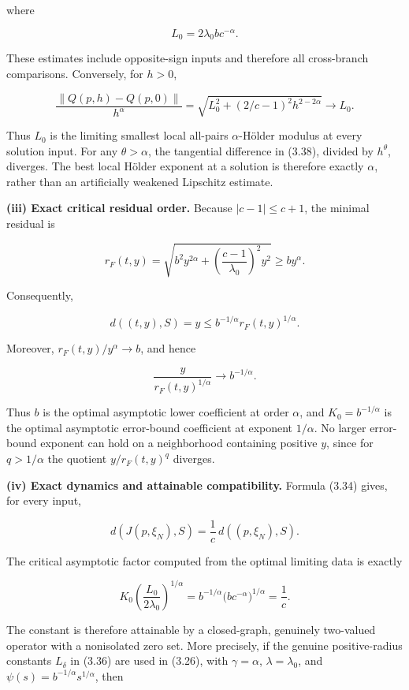 \documentclass[11pt,a4paper]{article}
\theoremstyle{plain}
\theoremstyle{definition}
\theoremstyle{remark}
\begin{document}
where

\[
L_0=2\lambda_0bc^{-\alpha}.
\tag{3.37}
\]

These estimates include opposite-sign inputs and therefore all
cross-branch comparisons. Conversely, for \(h>0\),

\[
\frac{\|Q(p,h)-Q(p,0)\|}{h^\alpha}
=\sqrt{L_0^2+(2/c-1)^2h^{2-2\alpha}}
\longrightarrow L_0.
\tag{3.38}
\]

Thus \(L_0\) is the limiting smallest local all-pairs \(\alpha\)-Hölder
modulus at every solution input. For any \(\theta>\alpha\), the
tangential difference in (3.38), divided by \(h^\theta\), diverges. The
best local Hölder exponent at a solution is therefore exactly
\(\alpha\), rather than an artificially weakened Lipschitz estimate.

\textbf{(iii) Exact critical residual order.} Because \(|c-1|\le c+1\),
the minimal residual is

\[
r_F(t,y)
=\sqrt{b^2y^{2\alpha}+\left(\frac{c-1}{\lambda_0}\right)^2y^2}
\ge by^\alpha.
\tag{3.39}
\]

Consequently,

\[
d((t,y),S)=y\le b^{-1/\alpha}r_F(t,y)^{1/\alpha}.
\tag{3.40}
\]

Moreover, \(r_F(t,y)/y^\alpha\to b\), and hence

\[
\frac{y}{r_F(t,y)^{1/\alpha}}\longrightarrow b^{-1/\alpha}.
\]

Thus \(b\) is the optimal asymptotic lower coefficient at order
\(\alpha\), and \(K_0=b^{-1/\alpha}\) is the optimal asymptotic
error-bound coefficient at exponent \(1/\alpha\). No larger error-bound
exponent can hold on a neighborhood containing positive \(y\), since for
\(q>1/\alpha\) the quotient \(y/r_F(t,y)^q\) diverges.

\textbf{(iv) Exact dynamics and attainable compatibility.} Formula
(3.34) gives, for every input,

\[
d(J(p,\xi_N),S)=\frac1c\,d((p,\xi_N),S).
\tag{3.41}
\]

The critical asymptotic factor computed from the optimal limiting data
is exactly

\[
K_0\left(\frac{L_0}{2\lambda_0}\right)^{1/\alpha}
=b^{-1/\alpha}\bigl(bc^{-\alpha}\bigr)^{1/\alpha}
=\frac1c.
\tag{3.42}
\]

The constant is therefore attainable by a closed-graph, genuinely
two-valued operator with a nonisolated zero set. More precisely, if the
genuine positive-radius constants \(L_\delta\) in (3.36) are used in
(3.26), with \(\gamma=\alpha\), \(\lambda=\lambda_0\), and
\(\psi(s)=b^{-1/\alpha}s^{1/\alpha}\), then
\end{document}
